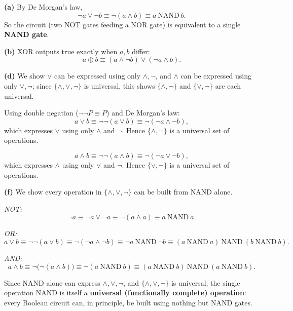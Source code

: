 \begin{solbox}

\begin{solution}
\textbf{(a)} By De Morgan's law,
\[
\neg a\vee\neg b \equiv \neg(a\wedge b) \equiv a\ \text{NAND}\ b.
\]
So the circuit (two NOT gates feeding a NOR gate) is equivalent to a single \textbf{NAND gate}.

\bigskip
\textbf{(b)} XOR outputs true exactly when $a,b$ differ:
\[
a\oplus b \equiv (a\wedge\neg b)\vee(\neg a\wedge b).
\]

\bigskip
\textbf{(d)} We show $\vee$ can be expressed using only $\wedge,\neg$, and $\wedge$ can be expressed using only $\vee,\neg$; since $\{\wedge,\vee,\neg\}$ is universal, this shows $\{\wedge,\neg\}$ and $\{\vee,\neg\}$ are each universal.

Using double negation ($\neg\neg P\equiv P$) and De Morgan's law:
\[
a\vee b \equiv \neg\neg(a\vee b) \equiv \neg(\neg a\wedge\neg b),
\]
which expresses $\vee$ using only $\wedge$ and $\neg$. Hence $\{\wedge,\neg\}$ is a universal set of operations.

\[
a\wedge b \equiv \neg\neg(a\wedge b) \equiv \neg(\neg a\vee\neg b),
\]
which expresses $\wedge$ using only $\vee$ and $\neg$. Hence $\{\vee,\neg\}$ is a universal set of operations.

\bigskip
\textbf{(f)} We show every operation in $\{\wedge,\vee,\neg\}$ can be built from NAND alone.

\smallskip
\noindent\textit{NOT:}
\[
\neg a \equiv \neg a\vee\neg a \equiv \neg(a\wedge a) \equiv a\ \text{NAND}\ a.
\]

\smallskip
\noindent\textit{OR:}
\[
a\vee b \equiv \neg\neg(a\vee b) \equiv \neg(\neg a\wedge\neg b) \equiv \neg a\ \text{NAND}\ \neg b \equiv (a\ \text{NAND}\ a)\ \text{NAND}\ (b\ \text{NAND}\ b).
\]

\smallskip
\noindent\textit{AND:}
\[
a\wedge b \equiv \neg\big(\neg(a\wedge b)\big) \equiv \neg(a\ \text{NAND}\ b) \equiv (a\ \text{NAND}\ b)\ \text{NAND}\ (a\ \text{NAND}\ b).
\]

\smallskip
Since NAND alone can express $\wedge,\vee,\neg$, and $\{\wedge,\vee,\neg\}$ is universal, the single operation NAND is itself a \textbf{universal (functionally complete) operation}: every Boolean circuit can, in principle, be built using nothing but NAND gates.
\end{solution}
\end{solbox}


